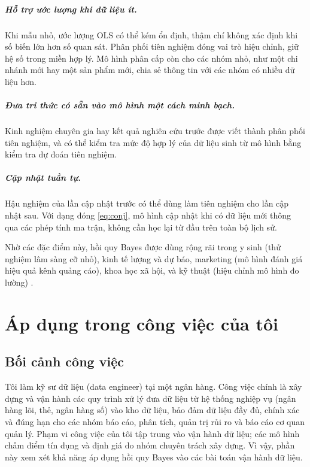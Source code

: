 \documentclass[12pt,a4paper]{report}
\begin{document}
\paragraph{Hỗ trợ ước lượng khi dữ liệu ít.} Khi mẫu nhỏ, ước lượng OLS có thể kém ổn định,
thậm chí không xác định khi số biến lớn hơn số quan sát. Phân phối tiên nghiệm đóng vai trò hiệu
chỉnh, giữ hệ số trong miền hợp lý. Mô hình phân cấp còn cho các nhóm nhỏ, như
một chi nhánh mới hay một sản phẩm mới, chia sẻ thông tin với các nhóm có nhiều dữ liệu hơn.

\paragraph{Đưa tri thức có sẵn vào mô hình một cách minh bạch.} Kinh nghiệm
chuyên gia hay kết quả nghiên cứu trước được viết thành phân phối tiên nghiệm, và có thể kiểm
tra mức độ hợp lý của dữ liệu sinh từ mô hình bằng kiểm tra dự đoán tiên nghiệm.

\paragraph{Cập nhật tuần tự.} Hậu nghiệm của lần cập nhật trước có thể dùng làm tiên nghiệm cho lần cập nhật sau. Với dạng
đóng \eqref{eq:conj}, mô hình cập nhật khi có dữ liệu mới thông qua các phép
tính ma trận, không cần học lại từ đầu trên toàn bộ lịch sử.

Nhờ các đặc điểm này, hồi quy Bayes được dùng rộng rãi trong y sinh (thử nghiệm
lâm sàng cỡ nhỏ), kinh tế lượng và dự báo, marketing (mô hình đánh giá hiệu quả
kênh quảng cáo), khoa học xã hội, và kỹ thuật (hiệu chỉnh mô hình đo lường)
\cite{gelman2013bda, mcelreath2020rethinking, kruschke2015dbda}.

\chapter{Áp dụng trong công việc của tôi}
\label{sec:work}

\section{Bối cảnh công việc}

Tôi làm kỹ sư dữ liệu (data engineer) tại một ngân hàng. Công việc chính là xây dựng và vận hành
các quy trình xử lý đưa dữ liệu từ hệ thống nghiệp vụ (ngân hàng lõi, thẻ, ngân hàng số)
vào kho dữ liệu, bảo đảm dữ liệu đầy đủ, chính xác và đúng hạn cho các nhóm báo cáo,
phân tích, quản trị rủi ro và báo cáo cơ quan quản lý. Phạm vi công việc của tôi tập trung vào vận hành dữ liệu; các mô hình chấm
điểm tín dụng và định giá do nhóm chuyên trách xây dựng. Vì vậy, phần này xem
xét khả năng áp dụng hồi quy Bayes vào các bài toán vận hành dữ liệu.
\end{document}
